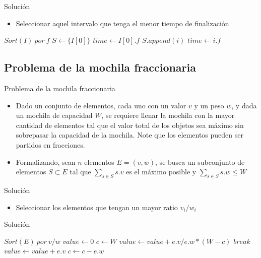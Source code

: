 \documentclass[]{beamer}
\begin{document}
\begin{frame}{Soluci\'on}
  \begin{itemize}
    \item Seleccionar aquel intervalo que tenga el menor tiempo de finalizaci\'on
  \end{itemize}
  \begin{algorithm}[H]
    \BlankLine
    $Sort(I)\ por\ f$ \;
    $S \leftarrow \{I[0]\}$ \;
    $time \leftarrow I[0].f$\;
    {
      {
        $S.append(i)$ \;
        $time \leftarrow i.f$
      }
    }
  \end{algorithm}
\end{frame}

\subsection{Problema de la mochila fraccionaria}
\begin{frame}{Problema de la mochila fraccionaria}
  \begin{itemize}
    \item Dado un conjunto de elementos, cada uno con un valor $v$ y un peso $w$, y dada un mochila de capacidad $W$, se requiere llenar la mochila con la mayor cantidad de elementos tal que el valor total de los objetos sea m\'aximo sin sobrepasar la capacidad de la mochila. Note que los elementos pueden ser partidos en fracciones.
      \pause
    \item Formalizando, sean $n$ elementos $E=(v,w)$, se busca un subconjunto de elementos $S\subset E$ tal que $\sum_{s \in S} s.v $ es el m\'aximo posible y $\sum_{s \in S} s.w \leq W$
  \end{itemize}
\end{frame}

\begin{frame}{Soluci\'on}
  \begin{itemize}
    \item Seleccionar los elementos que tengan un mayor ratio $v_i/w_i$
  \end{itemize}
\end{frame}

\begin{frame}{Soluci\'on}
  \begin{algorithm}[H]
    \BlankLine
    $Sort(E)\ por\ v/w$ \;
    $value \leftarrow 0$ \;
    $c \leftarrow W$ 
    {
      {
        $value \leftarrow value + e.v/e.w*(W-c)$ \;
        $break$
      }
      $value \leftarrow value + e.v$ \;
      $c \leftarrow c-e.w$ \;
    }
  \end{algorithm}
\end{frame}
\end{document}
